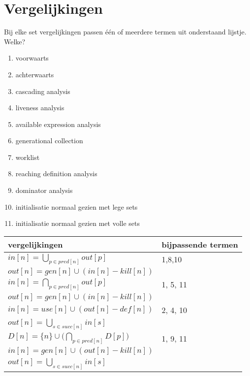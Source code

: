 \documentclass{report}
\begin{document}
	\newpage
	\section{Vergelijkingen}
	Bij elke set vergelijkingen passen één of meerdere termen uit onderstaand lijstje. Welke?
	\begin{enumerate}
		\item voorwaarts
		\item achterwaarts
		\item cascading analysis
		\item liveness analysis
		\item available expression analysis
		\item generational collection
		\item worklist
		\item reaching definition analysis
		\item dominator analysis
		\item initialisatie normaal gezien met lege sets
		\item initialisatie normaal gezien met volle sets
	\end{enumerate}
	\begin{table}[ht]
		\centering
		\begin{tabular}{| l | l |}
			\hline
			vergelijkingen & bijpassende termen \\
			\hline
			$in[n] = \bigcup_{p \in pred[n]} out[p]$ & 1,8,10 \\
			$out[n] = gen[n] \cup (in[n] - kill[n])$ & \\
			\hline
			$in[n] = \bigcap_{p \in pred[n]} out[p]$ & 1, 5, 11\\
			$out[n] = gen[n] \cup (in[n] - kill[n])$ & \\
			\hline
			$in[n] = use[n] \cup (out[n] - def[n])$ & 2, 4, 10\\
			$out[n] = \bigcup_{s \in succ[n]} in[s]$ & \\
			\hline
			$D[n] = \{n\} \cup \bigg(\bigcap_{p \in pred[n]} D[p]\bigg)$ & 1, 9, 11\\
			\hline
			$in[n] = gen[n] \cup (out[n] - kill[n])$ & \\
			$out[n] = \bigcup_{s \in succ[n]} in[s]$ & \\
			\hline
		\end{tabular}
	\end{table}

	\newpage
\end{document}
